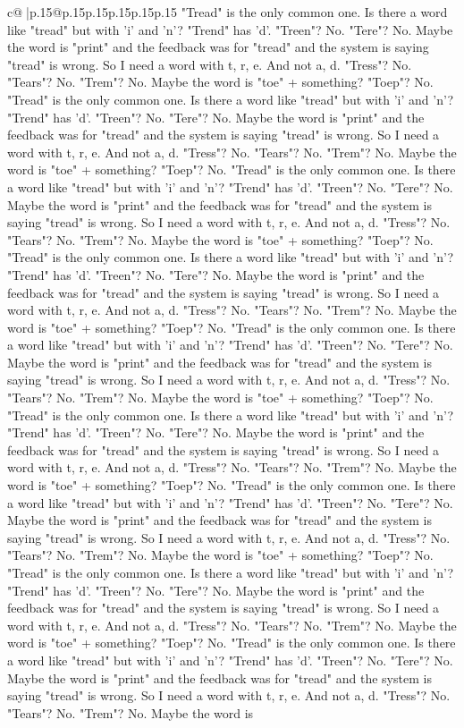\documentclass{article}
\begin{document}
{\begin{supertabular}{c@{$\;$}|p{.15\linewidth}@{}p{.15\linewidth}p{.15\linewidth}p{.15\linewidth}p{.15\linewidth}p{.15\linewidth}}
{{{"Tread" is the only common one. Is there a word like "tread" but with 'i' and 'n'? "Trend" has 'd'. "Treen"? No. "Tere"? No. Maybe the word is "print" and the feedback was for "tread" and the system is saying "tread" is wrong. So I need a word with t, r, e. And not a, d. "Tress"? No. "Tears"? No. "Trem"? No. Maybe the word is "toe" + something? "Toep"? No. "Tread" is the only common one. Is there a word like "tread" but with 'i' and 'n'? "Trend" has 'd'. "Treen"? No. "Tere"? No. Maybe the word is "print" and the feedback was for "tread" and the system is saying "tread" is wrong. So I need a word with t, r, e. And not a, d. "Tress"? No. "Tears"? No. "Trem"? No. Maybe the word is "toe" + something? "Toep"? No. "Tread" is the only common one. Is there a word like "tread" but with 'i' and 'n'? "Trend" has 'd'. "Treen"? No. "Tere"? No. Maybe the word is "print" and the feedback was for "tread" and the system is saying "tread" is wrong. So I need a word with t, r, e. And not a, d. "Tress"? No. "Tears"? No. "Trem"? No. Maybe the word is "toe" + something? "Toep"? No. "Tread" is the only common one. Is there a word like "tread" but with 'i' and 'n'? "Trend" has 'd'. "Treen"? No. "Tere"? No. Maybe the word is "print" and the feedback was for "tread" and the system is saying "tread" is wrong. So I need a word with t, r, e. And not a, d. "Tress"? No. "Tears"? No. "Trem"? No. Maybe the word is "toe" + something? "Toep"? No. "Tread" is the only common one. Is there a word like "tread" but with 'i' and 'n'? "Trend" has 'd'. "Treen"? No. "Tere"? No. Maybe the word is "print" and the feedback was for "tread" and the system is saying "tread" is wrong. So I need a word with t, r, e. And not a, d. "Tress"? No. "Tears"? No. "Trem"? No. Maybe the word is "toe" + something? "Toep"? No. "Tread" is the only common one. Is there a word like "tread" but with 'i' and 'n'? "Trend" has 'd'. "Treen"? No. "Tere"? No. Maybe the word is "print" and the feedback was for "tread" and the system is saying "tread" is wrong. So I need a word with t, r, e. And not a, d. "Tress"? No. "Tears"? No. "Trem"? No. Maybe the word is "toe" + something? "Toep"? No. "Tread" is the only common one. Is there a word like "tread" but with 'i' and 'n'? "Trend" has 'd'. "Treen"? No. "Tere"? No. Maybe the word is "print" and the feedback was for "tread" and the system is saying "tread" is wrong. So I need a word with t, r, e. And not a, d. "Tress"? No. "Tears"? No. "Trem"? No. Maybe the word is "toe" + something? "Toep"? No. "Tread" is the only common one. Is there a word like "tread" but with 'i' and 'n'? "Trend" has 'd'. "Treen"? No. "Tere"? No. Maybe the word is "print" and the feedback was for "tread" and the system is saying "tread" is wrong. So I need a word with t, r, e. And not a, d. "Tress"? No. "Tears"? No. "Trem"? No. Maybe the word is "toe" + something? "Toep"? No. "Tread" is the only common one. Is there a word like "tread" but with 'i' and 'n'? "Trend" has 'd'. "Treen"? No. "Tere"? No. Maybe the word is "print" and the feedback was for "tread" and the system is saying "tread" is wrong. So I need a word with t, r, e. And not a, d. "Tress"? No. "Tears"? No. "Trem"? No. Maybe the word is }}}
\end{supertabular}}
\end{document}
